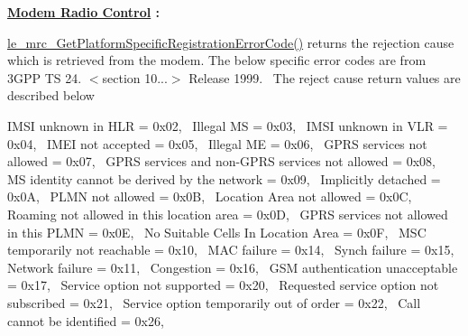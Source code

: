 {\bfseries \hyperlink{c_mrc}{Modem Radio Control} \+:}
\begin{DoxyItemize}
\item \hyperlink{le__mrc__interface_8h_a153247be5ea13ae2bc13ace0dd8c739c}{le\+\_\+mrc\+\_\+\+Get\+Platform\+Specific\+Registration\+Error\+Code()} returns the rejection cause which is retrieved from the modem.  The below specific error codes are from 3\+G\+PP TS 24. $<$section 10...$>$ Release 1999.~\newline
 The reject cause return values are described below

I\+M\+SI unknown in H\+LR = 0x02,~\newline
 Illegal MS = 0x03,~\newline
 I\+M\+SI unknown in V\+LR = 0x04,~\newline
 I\+M\+EI not accepted = 0x05,~\newline
 Illegal ME = 0x06,~\newline
 G\+P\+RS services not allowed = 0x07,~\newline
 G\+P\+RS services and non-\/\+G\+P\+RS services not allowed = 0x08,~\newline
 MS identity cannot be derived by the network = 0x09,~\newline
 Implicitly detached = 0x0A,~\newline
 P\+L\+MN not allowed = 0x0B,~\newline
 Location Area not allowed = 0x0C,~\newline
 Roaming not allowed in this location area = 0x0D,~\newline
 G\+P\+RS services not allowed in this P\+L\+MN = 0x0E,~\newline
 No Suitable Cells In Location Area = 0x0F,~\newline
 M\+SC temporarily not reachable = 0x10,~\newline
 M\+AC failure = 0x14,~\newline
 Synch failure = 0x15,~\newline
 Network failure = 0x11,~\newline
 Congestion = 0x16,~\newline
 G\+SM authentication unacceptable = 0x17,~\newline
 Service option not supported = 0x20,~\newline
 Requested service option not subscribed = 0x21,~\newline
 Service option temporarily out of order = 0x22,~\newline
 Call cannot be identified = 0x26,~\newline

\end{DoxyItemize}
